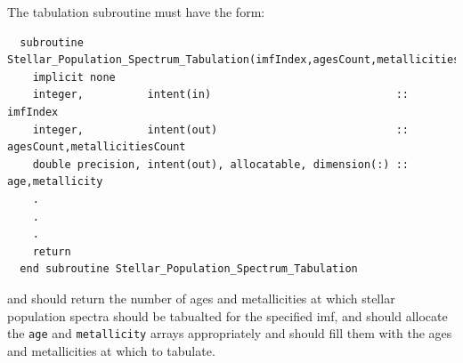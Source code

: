 The tabulation subroutine must have the form:
\begin{verbatim}
  subroutine Stellar_Population_Spectrum_Tabulation(imfIndex,agesCount,metallicitiesCount,age,metallicity)
    implicit none
    integer,          intent(in)                             :: imfIndex
    integer,          intent(out)                            :: agesCount,metallicitiesCount
    double precision, intent(out), allocatable, dimension(:) :: age,metallicity
    .
    .
    .
    return
  end subroutine Stellar_Population_Spectrum_Tabulation
\end{verbatim}
and should return the number of ages and metallicities at which stellar population spectra should be tabualted for the specified \gls{imf}, and should allocate the {\tt age} and {\tt metallicity} arrays appropriately and should fill them with the ages and metallicities at which to tabulate.

